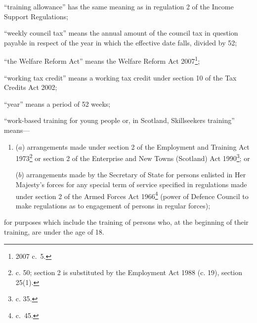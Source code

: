 \documentclass[12pt,a4paper]{article}
\begin{document}
\begin{enumerate}
“training allowance” has the same meaning as in regulation 2 of the Income Support Regulations;


“weekly council tax” means the annual amount of the council tax in question payable in respect of the year in which the effective date falls, divided by 52;

“the Welfare Reform Act” means the Welfare Reform Act 2007\footnote{2007 c.~5.};


“working tax credit” means a working tax credit under section 10 of the Tax Credits Act 2002;

“year” means a period of 52 weeks;

“work-based training for young people or, in Scotland, Skillseekers training”  %
means—
\begin{enumerate}\item[]
($a$)
arrangements made under section 2 of the Employment and Training Act 1973\footnote{ c. 50; section 2 is substituted by the Employment Act 1988 (c. 19), section 25(1).} or section 2 of the Enterprise and New Towns (Scotland) Act 1990\footnote{ c. 35.}; or

($b$)
arrangements made by the Secretary of State for persons enlisted in Her Majesty’s forces for any special term of service specified in regulations made under section 2 of the Armed Forces Act 1966\footnote{ c.~45.} (power of Defence Council to make regulations as to engagement of persons in regular forces);
\end{enumerate}

for purposes which include the training of persons who, at the beginning of their training, are under the age of 18.
\end{enumerate}
\end{document}
